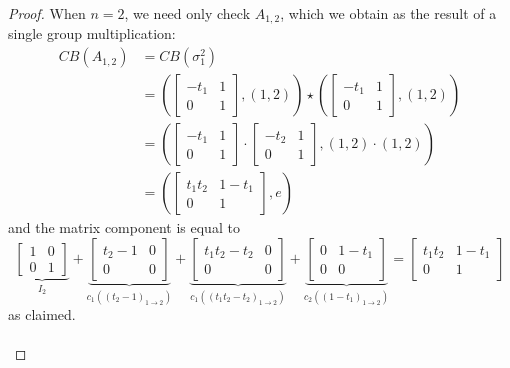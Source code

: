 \documentclass[11pt]{article}
\begin{document}
\begin{proof}
	When $n=2$, we need only check $A_{1,2}$, which we obtain as the result of a single
	group multiplication:
	\begin{align*}
		CB(A_{1,2})&=CB(\sigma_1^2)\\
		&=
		\left(
		\begin{bmatrix}
			-t_1 & 1\\
			0 & 1
		\end{bmatrix},(1,2)
		\right)
		\star
		\left(
		\begin{bmatrix}
			-t_1 & 1\\
			0 & 1
		\end{bmatrix},(1,2)
		\right)\\
		&=
		\left(
		\begin{bmatrix}
			-t_1 & 1\\
			0 & 1
		\end{bmatrix}
		\cdot 
		\begin{bmatrix}
			-t_2 & 1\\
			0 & 1
		\end{bmatrix},(1,2)\cdot (1,2)
		\right)\\
		&=
		\left(
		\begin{bmatrix}
			t_1t_2 & 1-t_1\\
			0 & 1
		\end{bmatrix},e
		\right)
	\end{align*}
	and the matrix component is equal to
	$$
	\underbrace{\begin{bmatrix}
			1 & 0 \\
			0 & 1
	\end{bmatrix}}_{I_2}
	+
	\underbrace{\begin{bmatrix}
			t_2-1 & 0 \\
			0 & 0
	\end{bmatrix}}_{c_1((t_2-1)_{1\to 2})}
	+
	\underbrace{\begin{bmatrix}
			t_1t_2-t_2 & 0\\
			0 & 0
	\end{bmatrix}}_{c_1((t_1t_2-t_2)_{1\to 2})}
	+
	\underbrace{\begin{bmatrix}
			0 & 1-t_1\\
			0 & 0
	\end{bmatrix}}_{c_2((1-t_1)_{1\to 2})}
	=
	\begin{bmatrix}
		t_1t_2 & 1-t_1\\
		0 & 1
	\end{bmatrix}
	$$
	as claimed.
	\\
	\\

\end{proof}
\end{document}
